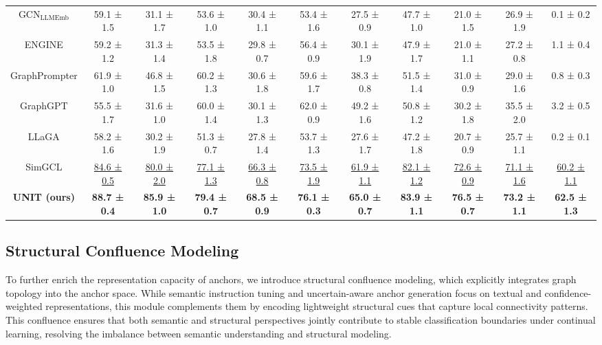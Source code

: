\documentclass[sigconf]{acmart}
\begin{document}
\begin{table}
\begin{tabular}{ccccccccccc}
\midrule
GCN$_{\text{LLMEmb}}$   & 59.1 ± 1.5 & 31.1 ± 1.7 & 53.6 ± 1.0 & 30.4 ± 1.1 & 53.4 ± 1.6 & 27.5 ± 0.9 & 47.7 ± 1.0 & 21.0 ± 1.5 & 26.9 ± 1.9 & 0.1 ± 0.2 \\
ENGINE      & 59.2 ± 1.2 & 31.3 ± 1.4 & 53.5 ± 1.8 & 29.8 ± 0.7 & 56.4 ± 0.9 & 30.1 ± 1.9 & 47.9 ± 1.7 & 21.0 ± 1.1 & 27.2 ± 0.8 & 1.1 ± 0.4 \\
GraphPrompter & 61.9 ± 1.0 & 46.8 ± 1.5 & 60.2 ± 1.3 & 30.6 ± 1.8 & 59.6 ± 1.7 & 38.3 ± 0.8 & 51.5 ± 1.4 & 31.0 ± 0.9 & 29.0 ± 1.6 & 0.8 ± 0.3 \\
GraphGPT    & 55.5 ± 1.7 & 31.6 ± 1.0 & 60.0 ± 1.4 & 30.1 ± 1.3 & 62.0 ± 0.9 & 49.2 ± 1.6 & 50.8 ± 1.2 & 30.2 ± 1.8 & 35.5 ± 2.0 & 3.2 ± 0.5 \\
LLaGA       & 58.2 ± 1.6 & 30.2 ± 1.9 & 51.3 ± 0.7 & 27.8 ± 1.4 & 53.7 ± 1.3 & 27.6 ± 1.7 & 47.2 ± 1.8 & 20.7 ± 0.9 & 25.7 ± 1.1 & 0.2 ± 0.1 \\
SimGCL  & \underline{84.6 ± 0.5} & \underline{80.0 ± 2.0} & \underline{77.1 ± 1.3} & \underline{66.3 ± 0.8} & \underline{73.5 ± 1.9} & \underline{61.9 ± 1.1} & \underline{82.1 ± 1.2} & \underline{72.6 ± 0.9} & \underline{71.1 ± 1.6} & \underline{60.2 ± 1.1} \\
\midrule
\textbf{UNIT (ours) } & \textbf{88.7 ± 0.4} & \textbf{85.9 ± 1.0} & \textbf{79.4 ± 0.7} & \textbf{68.5 ± 0.9} & \textbf{76.1 ± 0.3} & \textbf{65.0 ± 0.7} & \textbf{83.9 ± 1.1} & \textbf{76.5 ± 0.7} & \textbf{73.2 ± 1.1} & \textbf{62.5 ± 1.3} \\
\bottomrule
\end{tabular}
\label{main_results}
\end{table}


\subsection{Structural Confluence Modeling}
To further enrich the representation capacity of anchors, we introduce structural confluence modeling, which explicitly integrates graph topology into the anchor space. 
While semantic instruction tuning and uncertain-aware anchor generation focus on textual and confidence-weighted representations, this module complements them by encoding lightweight structural cues that capture local connectivity patterns. 
This confluence ensures that both semantic and structural perspectives jointly contribute to stable classification boundaries under continual learning, resolving the imbalance
between semantic understanding and structural modeling.  
\end{document}
